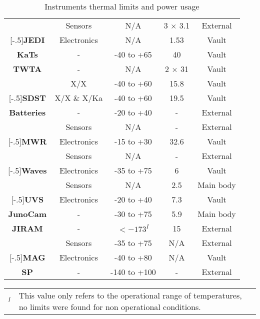 \begin{table}[H]
\begin{tabular}{|c||c|c|c|c|}
        &  Sensors & N/A & 3 $\times$ 3.1 & External \\
        \hhline{|~|-|-|-|-|}
        \multirow{-2}{*}[-.5\arrayrulewidth]{\textbf{JEDI} \cite{JEDI_info}} &  Electronics & N/A & 1.53 & Vault \\
        \hline
        \textbf{KaTs} \cite{KaTs_info} & - & -40 to +65 & 40 & Vault \\
        \hline
        \textbf{TWTA} \cite{juno_telecommunication} & - & N/A & 2 $\times$ 31 & Vault \\
        \hline
        & X/X & -40 to +60 & 15.8 & Vault \\
        \hhline{|~|-|-|-|-|}
        \multirow{-2}{*}[-.5\arrayrulewidth]{\textbf{SDST} \cite{SDST_info}} & X/X \& X/Ka & -40 to +60 & 19.5 & Vault \\
        \hline
        \textbf{Batteries} \cite{batteries_info} & - & -20 to +40 & - & External \\
        \hline
        & Sensors & N/A & - & External \\
        \hhline{|~|-|-|-|-|}
        \multirow{-2}{*}[-.5\arrayrulewidth]{\textbf{MWR} \cite{MWR_info}} & Electronics & -15 to +30 & 32.6 & Vault \\
        \hline
        & Sensors & N/A & - & External \\
        \hhline{|~|-|-|-|-|}
        \multirow{-2}{*}[-.5\arrayrulewidth]{\textbf{Waves} \cite{Waves_info}} & Electronics & -35 to +75 & 6 & Vault \\
        \hline
        & Sensors & N/A & 2.5 & Main body \\
        \hhline{|~|-|-|-|-|}
        \multirow{-2}{*}[-.5\arrayrulewidth]{\textbf{UVS} \cite{UVS_info}} & Electronics & -20 to +40 & 7.3 & Vault \\
        \hline
        \textbf{JunoCam} \cite{JunoCam_info} & - & -30 to +75 & 5.9 & Main body \\
        \hline
        \textbf{JIRAM} \cite{JIRAM_info} & - & $<-173^I$ & 15 & External \\
        \hline
        & Sensors & -35 to +75 & N/A & External \\
        \hhline{|~|-|-|-|-|}
        \multirow{-2}{*}[-.5\arrayrulewidth]{\textbf{MAG} \cite{MAG_info}} & Electronics & -40 to +80 & N/A & Vault \\
        \hline
        \textbf{SP} \cite{solar_panels_coef}& - & -140 to +100 & - & External \\
        \hline
    \end{tabular}
    \caption{Instruments thermal limits and power usage}
    \label{table:thermal_limits}
\end{table}

\begin{small}
\begin{tabular}{ll}
    $^I$ & This value only refers to the operational range of temperatures, no limits were found for non operational conditions.
\end{tabular}
\end{small}